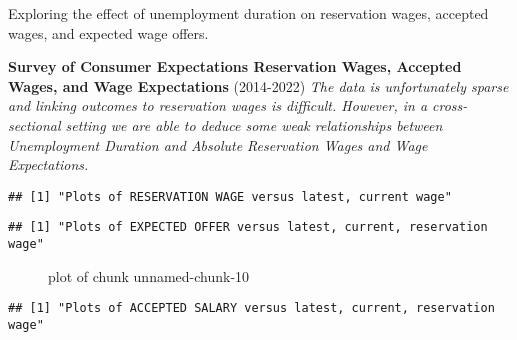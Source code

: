 Exploring the effect of unemployment duration on reservation wages,
accepted wages, and expected wage offers.

\textbf{Survey of Consumer Expectations Reservation Wages, Accepted
Wages, and Wage Expectations} (2014-2022) \emph{The data is
unfortunately sparse and linking outcomes to reservation wages is
difficult. However, in a cross-sectional setting we are able to deduce
some weak relationships between Unemployment Duration and Absolute
Reservation Wages and Wage Expectations.}

\begin{Shaded}
\begin{Highlighting}[]
\NormalTok{(}\NormalTok{(}\NormalTok{))}
\end{Highlighting}
\end{Shaded}

\begin{verbatim}
## [1] "Plots of RESERVATION WAGE versus latest, current wage"
\end{verbatim}


\begin{verbatim}
## [1] "Plots of EXPECTED OFFER versus latest, current, reservation wage"
\end{verbatim}

\begin{figure}
\centering
{}
\caption{plot of chunk unnamed-chunk-10}
\end{figure}

\begin{verbatim}
## [1] "Plots of ACCEPTED SALARY versus latest, current, reservation wage"
\end{verbatim}


